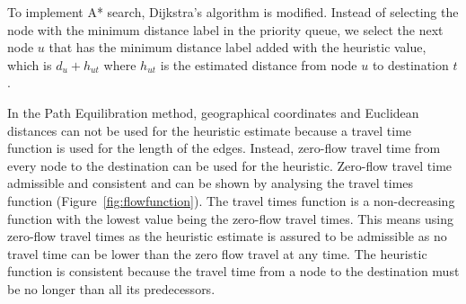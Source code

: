 To implement A* search,
Dijkstra's algorithm is modified.
Instead of selecting the node with the minimum distance label in the priority queue,
we select the next node $u$ that has the minimum distance label added with the heuristic value, which is $d_u + h_{ut}$ where $h_{ut}$ is the estimated distance from node $u$ to destination $t$.

In the Path Equilibration method,
geographical coordinates and Euclidean distances can not be used for the heuristic estimate because a travel time function is used for the length of the edges.
Instead, zero-flow travel time from every node to the destination can be used for the heuristic.
Zero-flow travel time admissible and consistent and can be shown by
analysing the travel times function (Figure~\ref{fig:flowfunction}).
The travel times function is a non-decreasing function with the lowest value being the zero-flow travel times.
This means using zero-flow travel times as the heuristic estimate
is assured to be admissible
as no travel time can be lower than the zero flow travel at any time.
The heuristic function is consistent because the travel time from a node to the destination must be no longer than all its predecessors.


\begin{comment}
\subsection{Linear Programming Perspective}
\todo[inline]{incomplete}
A* search can be describe in a linear programming perspective.
The reduced cost is $c_{ij} - y_j +y_i$ where $y_j$ and $y_i$ are the dual variables for $(i,j) \in E$, 
essentially A* search puts weight on the edges to and select  out the path with the maximum reduces cost, the weight is the heuristic values.
\begin{alignat}{2}
    \text{Primal: Minimise}   & \quad \sum_{(i, j)\in E} c_{ij} x_{ij} \\
    \text{Subject to} & \quad \sum_j x_{ij} - \sum_j x_{ji} = 0 \quad \forall i\\
    & \quad \sum_j x_{sj} - \sum_j x_{js} = 1 \\
    & \quad \sum_j x_{tj} - \sum_j x_{jt} = -1 \\
    & \quad x_{ij} = \{0,1\} \quad \forall (i,j) \in E
\end{alignat}

\begin{alignat}{2}
    \text{Dual: Maximise} & \quad y_t - y_s \\
    \text{Subject to} & \quad y_j - y_i \leq c_{ij} \quad \forall (i,j) \in E \\
    \text{where} & \quad y_{\cdot} = \sum_j x_{\cdot j} - \sum_j x_{j\cdot}  
\end{alignat}
\end{comment}

